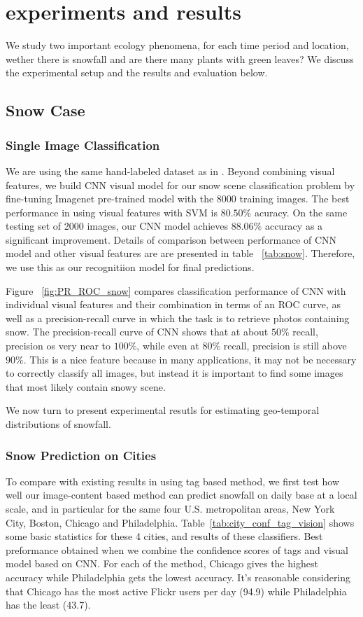\section{experiments and results}
We study two important ecology phenomena, for each time period and location, 
wether there is snowfall and are there many plants with green leaves? We discuss the experimental setup 
and the results and evaluation below.
\subsection{Snow Case}
\subsubsection{Single Image Classification}
We are using the same hand-labeled dataset as in .
Beyond combining visual features, 
we build CNN visual model for our snow scene classification problem 
by fine-tuning Imagenet pre-trained model with the 8000 training images. The best 
performance in  using visual features with SVM is $80.50\%$ acuracy.
On the same testing set of 2000 images, our CNN model achieves $88.06\%$ accuracy as a significant 
improvement. Details of comparison between performance of CNN model
 and other visual features are  are presented in table ~\ref{tab:snow}. Therefore, we use this as our recognitiion model for final predictions.

Figure ~\ref{fig:PR_ROC_snow} compares classification performance of CNN with 
individual visual features and their combination in terms of an ROC curve, 
as well as a precision-recall curve in which the task is to retrieve photos containing snow.
The precision-recall curve of CNN shows that at about $50\%$ recall, precision os very near to $100\%$, 
while even at $80\%$ recall, precision is still above $90\%$. This is a nice feature because 
in many applications, it may not be necessary to correctly 
classify all images, but instead it is important to find some images that most likely contain snowy 
scene.

We now turn to present experimental resutls for estimating geo-temporal distributions of snowfall.

\subsubsection{Snow Prediction on Cities}
To compare with existing results in  using tag based method,
we first test how well our image-content based method can predict snowfall on daily base at a local scale, 
and in particular 
for the same four U.S. metropolitan areas, New York City, Boston, Chicago and Philadelphia. 
Table~\ref{tab:city_conf_tag_vision} 
shows some basic statistics for these 4 cities, and results of these classifiers. 
Best preformance obtained when we combine 
the confidence scores of tags and visual model based on CNN. For each of the method, 
Chicago gives the highest accuracy while Philadelphia gets the lowest accuracy. 
It's reasonable considering that Chicago has the most active Flickr users per
day (94.9) while Philadelphia has the least (43.7). 

